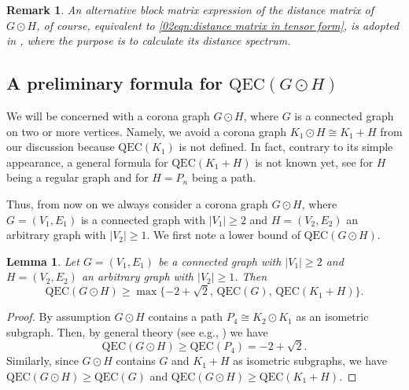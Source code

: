\documentclass[12pt,a4paper]{article}
\newtheorem{lemma}[theorem]{Lemma}
\newtheorem{remark}[theorem]{Remark}
\newcommand{\1}{{\bm 1}}
\numberwithin{equation}{section}
\begin{document}
\begin{remark}\normalfont
An alternative block matrix expression of
the distance matrix of $G\odot H$,
of course, equivalent to \eqref{02eqn:distance matrix in tensor form},
is adopted in \cite{Indulal-Stevanovic2015},
where the purpose is to 
calculate its distance spectrum.
\end{remark}



\subsection{A preliminary formula for $\mathrm{QEC}(G\odot H)$}

We will be concerned with a corona graph $G\odot H$,
where $G$ is a connected graph on two or more vertices.
Namely, we avoid a corona graph $K_1\odot H\cong K_1+H$
from our discussion because $\mathrm{QEC}(K_1)$ is not defined.
In fact, contrary to its simple appearance, 
a general formula for $\mathrm{QEC}(K_1+H)$ is not
known yet, see \cite{Lou-Obata-Huang2022}
for $H$ being a regular graph
and \cite{Mlotkowski-Obata2025a,Mlotkowski-Obata2025b}
for $H=P_n$ being a path.

Thus, from now on we always consider
a corona graph $G\odot H$, where
$G=(V_1,E_1)$ is a connected graph with $|V_1|\ge2$
and $H=(V_2,E_2)$ an arbitrary graph with $|V_2|\ge1$.
We first note a lower bound of $\mathrm{QEC}(G\odot H)$.

\begin{lemma}\label{01lem:lower bound}
Let $G=(V_1,E_1)$ be a connected graph with $|V_1|\ge2$
and $H=(V_2,E_2)$ an arbitrary graph with $|V_2|\ge1$.
Then 
\begin{equation}\label{02eqn:lower bound}
\mathrm{QEC}(G\odot H)
\ge \max\{-2+\sqrt2,\, \mathrm{QEC}(G),\, \mathrm{QEC}(K_1+H)\}.
\end{equation}
\end{lemma}

\begin{proof}
By assumption $G\odot H$ contains a path $P_4\cong K_2\odot K_1$
as an isometric subgraph.
Then, by general theory (see e.g., \cite{Obata-Zakiyyah2018}) we have
\[
\mathrm{QEC}(G\odot H)\ge \mathrm{QEC}(P_4)=-2+\sqrt2.
\]
Similarly, since $G\odot H$ contains $G$ and $K_1+H$ 
as isometric subgraphs, we have
$\mathrm{QEC}(G\odot H)\ge \mathrm{QEC}(G)$ and
$\mathrm{QEC}(G\odot H)\ge \mathrm{QEC}(K_1+H)$.
\end{proof}
\end{document}
